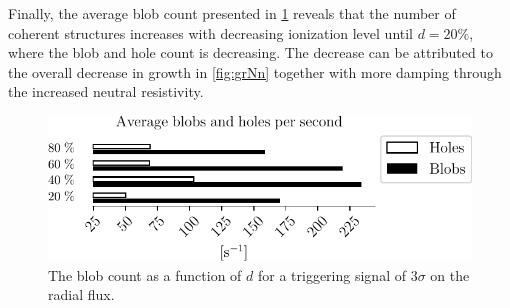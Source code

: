 Finally, the average blob count presented in \cref{fig:nnScanBlobCount} reveals that the number of coherent structures increases with decreasing ionization level until $d=20\%$, where the blob and hole count is decreasing.
The decrease can be attributed to the overall decrease in growth in \cref{fig:grNn} together with more damping through the increased neutral resistivity.
%
\begin{figure}[htb]
    \centering
    \includegraphics{fig/results/neutral/nnScanBlobCount}
    \caption{The blob count as a function of $d$ for a triggering signal of $3\sigma$ on the radial flux.}
    \label{fig:nnScanBlobCount}
\end{figure}
%
